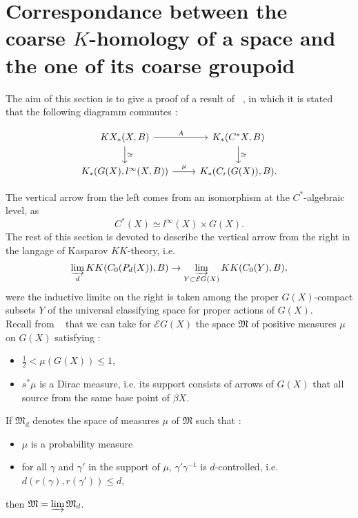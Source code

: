 \section{Correspondance between the coarse $K$-homology of a space and the one of its coarse groupoid}

The aim of this section is to give a proof of a result of ~\cite{TuBC}, in which it is stated that the following diagramm commutes :

\[\begin{tikzcd}KX_* (X,B)\arrow{r}{A}\arrow{d}{\simeq} & K_*(C^*X,B) \arrow{d}{\simeq}\\
K_*(G(X),l^{\infty}(X,B))\arrow{r}{\mu} & K_*(C_r(G(X)),B).
\end{tikzcd}\]

The vertical arrow from the left comes from an isomorphism at the $C^*$-algebraic level, as
\[C^*(X) \simeq l^\infty(X)\times G(X).\] %
The rest of this section is devoted to describe the vertical arrow from the right in the langage of Kasparov $KK$-theory, i.e.
\[\varinjlim_d KK(C_0(P_d(X)),B)\rightarrow \varinjlim_{Y\subset \mathcal E G(X)} KK(C_0(Y),B),\]
were the inductive limite on the right is taken among the proper $G(X)$-compact subsets $Y$ of the universal classifying space for proper actions of $G(X)$.\\

Recall from ~\cite{TuNovikov} that we can take for $\mathcal E G(X) $ the space $\mathfrak M$ of positive measures $\mu$ on $G(X)$ satisfying :
\begin{itemize}
\item $\frac{1}{2}<\mu(G(X))\leq 1$, 
\item $s^*\mu$ is a Dirac measure, i.e. its support consists of arrows of $G(X)$ that all source from the same base point of $\beta X$.\\
\end{itemize}

If $\mathfrak M_d$ denotes the space of measures $\mu$ of $\mathfrak M$ such that :
\begin{itemize}
\item $\mu$ is a probability measure
\item for all $\gamma$ and $\gamma'$ in the support of $\mu$, $\gamma'\gamma^{-1}$ is $d$-controlled, i.e. $d(r(\gamma),r(\gamma'))\leq d$, 
\end{itemize}
then $\mathfrak M=\varinjlim \mathfrak M_d$.\\ %

